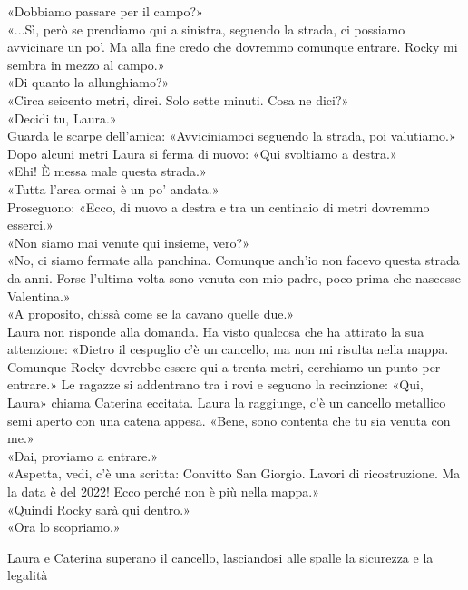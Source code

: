 \par\medskip
«Dobbiamo passare per il campo?»\\
«...Sì, per\`o se  prendiamo qui a sinistra, seguendo la strada, ci possiamo avvicinare un po’.
Ma alla fine credo che dovremmo comunque entrare. Rocky mi sembra in mezzo al campo.»\\
«Di quanto la allunghiamo?»\\
«Circa seicento metri, direi. Solo sette minuti. Cosa ne dici?»\\
«Decidi tu, Laura.»\\
Guarda le scarpe dell'amica: «Avviciniamoci seguendo la strada, poi valutiamo.»\\
Dopo alcuni metri Laura si ferma di nuovo:
«Qui svoltiamo a destra.»\\
«Ehi! \`E messa male questa strada.»\\
«Tutta l’area ormai \`e un po’ andata.»\\
Proseguono:
«Ecco, di nuovo a destra e tra un centinaio di metri dovremmo esserci.»\\
«Non siamo mai venute qui insieme, vero?»\\
«No, ci siamo fermate alla panchina. Comunque anch'io non facevo questa strada da anni.
Forse l’ultima volta sono venuta con mio padre, poco prima che nascesse Valentina.»\\
«A proposito, chissà come se la cavano quelle due.»\\

Laura non risponde alla domanda. Ha visto qualcosa che ha attirato la sua attenzione:
«Dietro il cespuglio c’\`e un cancello, ma non mi risulta nella mappa. Comunque Rocky dovrebbe essere qui a trenta metri, cerchiamo un punto per entrare.» Le ragazze si addentrano tra i rovi e seguono la recinzione: «Qui, Laura»  chiama Caterina eccitata. Laura la raggiunge, c'\`e un cancello metallico semi aperto con una catena appesa.
«Bene, sono contenta che tu sia venuta con me.»\\
«Dai, proviamo a entrare.»\\
«Aspetta, vedi, c’\`e una scritta: Convitto San Giorgio.
Lavori di ricostruzione. Ma la data \`e del 2022! Ecco perch\'e non \`e pi\`u nella mappa.»\\
«Quindi Rocky sarà qui dentro.»\\
«Ora lo scopriamo.»

\par\medskip
Laura e Caterina superano il cancello, lasciandosi alle spalle la sicurezza e la legalità
